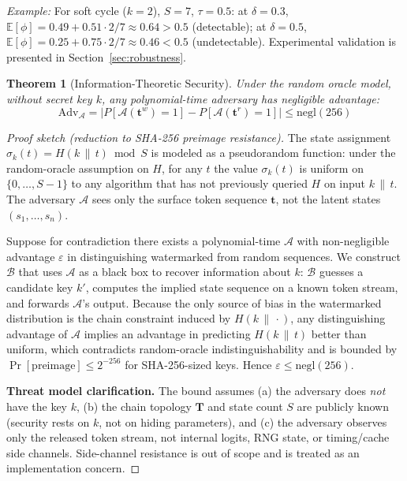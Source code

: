 \documentclass[11pt]{article}
\newtheorem{theorem}{Theorem}[section]
\theoremstyle{definition}
\theoremstyle{remark}
\begin{document}
\noindent
\textit{Example:} For soft cycle ($k{=}2$), $S=7$, $\tau=0.5$: at $\delta=0.3$, $\mathbb{E}[\phi] = 0.49 + 0.51 \cdot 2/7 \approx 0.64 > 0.5$ (detectable); at $\delta=0.5$, $\mathbb{E}[\phi] = 0.25 + 0.75 \cdot 2/7 \approx 0.46 < 0.5$ (undetectable). Experimental validation is presented in Section~\ref{sec:robustness}.

\begin{theorem}[Information-Theoretic Security]
\label{thm:security}
Under the random oracle model, without secret key $k$, any polynomial-time adversary has negligible advantage:
$$\text{Adv}_{\mathcal{A}} = |P[\mathcal{A}(\mathbf{t}^w) = 1] - P[\mathcal{A}(\mathbf{t}^r) = 1]| \leq \text{negl}(256)$$
\end{theorem}

\begin{proof}[Proof sketch (reduction to SHA-256 preimage resistance)]
The state assignment $\sigma_k(t) = H(k \,\|\, t) \bmod S$ is modeled as a pseudorandom function: under the random-oracle assumption on $H$, for any $t$ the value $\sigma_k(t)$ is uniform on $\{0, \ldots, S{-}1\}$ to any algorithm that has not previously queried $H$ on input $k \,\|\, t$. The adversary $\mathcal{A}$ sees only the surface token sequence $\mathbf{t}$, not the latent states $(s_1, \ldots, s_n)$.

Suppose for contradiction there exists a polynomial-time $\mathcal{A}$ with non-negligible advantage $\varepsilon$ in distinguishing watermarked from random sequences. We construct $\mathcal{B}$ that uses $\mathcal{A}$ as a black box to recover information about $k$: $\mathcal{B}$ guesses a candidate key $k'$, computes the implied state sequence on a known token stream, and forwards $\mathcal{A}$'s output. Because the only source of bias in the watermarked distribution is the chain constraint induced by $H(k \,\|\, \cdot)$, any distinguishing advantage of $\mathcal{A}$ implies an advantage in predicting $H(k \,\|\, t)$ better than uniform, which contradicts random-oracle indistinguishability and is bounded by $\Pr[\text{preimage}] \leq 2^{-256}$ for SHA-256-sized keys. Hence $\varepsilon \leq \mathrm{negl}(256)$.

\textbf{Threat model clarification.} The bound assumes (a) the adversary does \emph{not} have the key $k$, (b) the chain topology $\mathbf{T}$ and state count $S$ are publicly known (security rests on $k$, not on hiding parameters), and (c) the adversary observes only the released token stream, not internal logits, RNG state, or timing/cache side channels. Side-channel resistance is out of scope and is treated as an implementation concern.
\end{proof}
\end{document}
